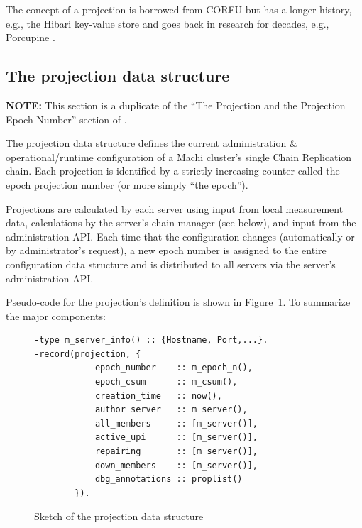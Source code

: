 \documentclass[preprint,10pt]{sigplanconf}
\begin{document}
The concept of a projection is borrowed
from CORFU but has a longer history, e.g., the Hibari key-value store
\cite{cr-theory-and-practice} and goes back in research for decades,
e.g., Porcupine \cite{porcupine}.

\subsection{The projection data structure}
\label{sub:the-projection}

{\bf NOTE:} This section is a duplicate of the ``The Projection and
the Projection Epoch Number'' section of \cite{machi-design}.

The projection data
structure defines the current administration \& operational/runtime
configuration of a Machi cluster's single Chain Replication chain.
Each projection is identified by a strictly increasing counter called
the epoch projection number (or more simply ``the epoch'').

Projections are calculated by each server using input from local
measurement data, calculations by the server's chain manager
(see below), and input from the administration API.
Each time that the configuration changes (automatically or by
administrator's request), a new epoch number is assigned
to the entire configuration data structure and is distributed to
all servers via the server's administration API.

Pseudo-code for the projection's definition is shown in
Figure~\ref{fig:projection}.  To summarize the major components:

\begin{figure}
\begin{verbatim}
-type m_server_info() :: {Hostname, Port,...}.
-record(projection, {
            epoch_number    :: m_epoch_n(),
            epoch_csum      :: m_csum(),
            creation_time   :: now(),
            author_server   :: m_server(),
            all_members     :: [m_server()],
            active_upi      :: [m_server()],
            repairing       :: [m_server()],
            down_members    :: [m_server()],
            dbg_annotations :: proplist()
        }).
\end{verbatim}
\caption{Sketch of the projection data structure}
\label{fig:projection}
\end{figure}
\end{document}
